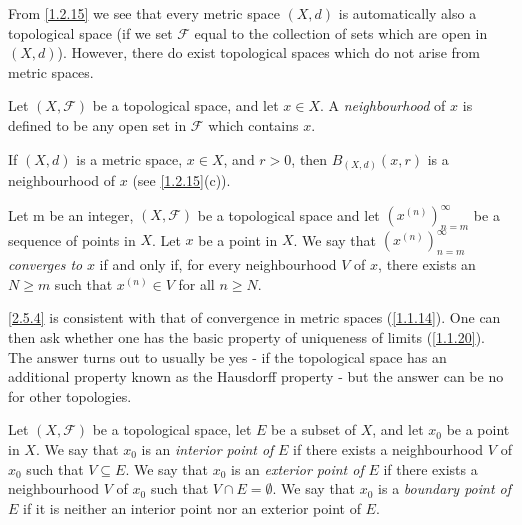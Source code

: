 \begin{note}
  From \cref{1.2.15} we see that every metric space \((X, d)\) is automatically also a topological space
  (if we set \(\mathcal{F}\) equal to the collection of sets which are open in \((X, d)\)).
  However, there do exist topological spaces which do not arise from metric spaces.
\end{note}

\begin{defn}[Neighbourhoods]\label{2.5.2}
  Let \((X, \mathcal{F})\) be a topological space, and let \(x \in X\).
  A \emph{neighbourhood} of \(x\) is defined to be any open set in \(\mathcal{F}\) which contains \(x\).
\end{defn}

\begin{eg}\label{2.5.3}
  If \((X, d)\) is a metric space, \(x \in X\), and \(r > 0\), then \(B_{(X, d)}(x, r)\) is a neighbourhood of \(x\) (see \cref{1.2.15}(c)).
\end{eg}

\begin{defn}\label{2.5.4}
  Let m be an integer, \((X, \mathcal{F})\) be a topological space and let \((x^{(n)})_{n = m}^\infty\) be a sequence of points in \(X\).
  Let \(x\) be a point in \(X\).
  We say that \((x^{(n)})_{n = m}^\infty\) \emph{converges to} \(x\) if and only if, for every neighbourhood \(V\) of \(x\), there exists an \(N \geq m\) such that \(x^{(n)} \in V\) for all \(n \geq N\).
\end{defn}

\begin{note}
  \cref{2.5.4} is consistent with that of convergence in metric spaces (\cref{1.1.14}).
  One can then ask whether one has the basic property of uniqueness of limits (\cref{1.1.20}).
  The answer turns out to usually be yes
  - if the topological space has an additional property known as the Hausdorff property
  - but the answer can be no for other topologies.
\end{note}

\begin{defn}\label{2.5.5}
  Let \((X, \mathcal{F})\) be a topological space, let \(E\) be a subset of \(X\), and let \(x_0\) be a point in \(X\).
  We say that \(x_0\) is an \emph{interior point of} \(E\) if there exists a neighbourhood \(V\) of \(x_0\) such that \(V \subseteq E\).
  We say that \(x_0\) is an \emph{exterior point of} \(E\) if there exists a neighbourhood \(V\) of \(x_0\) such that \(V \cap E = \emptyset\).
  We say that \(x_0\) is a \emph{boundary point of} \(E\) if it is neither an interior point nor an exterior point of \(E\).
\end{defn}

